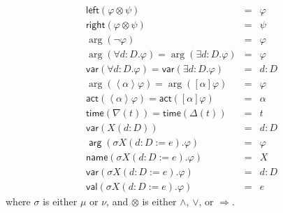 \documentclass{article}
\begin{document}
\begin{equation*}
\begin{array}{lcl}
\mathsf{left}(\varphi \otimes \psi ) & = & \varphi \\ 
\mathsf{right}(\varphi \otimes \psi ) & = & \psi \\ 
\arg (\lnot \varphi ) & = & \varphi \\ 
\arg (\forall d:D.\varphi )=\arg (\exists d:D.\varphi ) & = & \varphi \\ 
\mathsf{var}(\forall d:D.\varphi )=\mathsf{var}(\exists d:D.\varphi ) & = & 
d:D \\ 
\arg (\left\langle \alpha \right\rangle \varphi )=\arg ([\alpha ]\varphi ) & 
= & \varphi \\ 
\mathsf{act}(\left\langle \alpha \right\rangle \varphi )=\mathsf{act}%
([\alpha ]\varphi ) & = & \alpha \\ 
\mathsf{time}(\nabla (t))=\mathsf{time}(\Delta (t)) & = & t \\ 
\mathsf{var}(X(d:D)) & = & d:D \\ 
\mathsf{\arg }(\sigma X(d:D:=e).\varphi ) & = & \varphi \\ 
\mathsf{name}(\sigma X(d:D:=e).\varphi ) & = & X \\ 
\mathsf{var}(\sigma X(d:D:=e).\varphi ) & = & d:D \\ 
\mathsf{val}(\sigma X(d:D:=e).\varphi ) & = & e%
\end{array}%
\end{equation*}%
where $\sigma $ is either $\mu $ or $\nu $, and $\otimes $ is either $\wedge 
$, $\vee $, or $\Rightarrow $.
\end{document}
